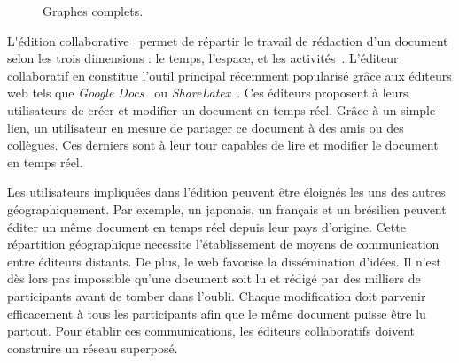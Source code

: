 




\begin{figure}
  \begin{center}
    
    \caption[Graphes complets]{\label{net:fig:completegraph}Graphes complets.}
  \end{center}
\end{figure}

\lettrine{L}'édition collaborative~\cite{ellis1991groupware} permet de répartir
le travail de rédaction d'un document selon les trois dimensions : le temps,
l'espace, et les activités~\cite{desanctis1987foundation,
  grudin1994computersupported, johansen1988groupware}. L'éditeur collaboratif en
constitue l'outil principal récemment popularisé grâce aux éditeurs web tels que
\emph{Google Docs}~\cite{googledocs} ou \emph{ShareLatex}~\cite{sharelatex}. Ces
éditeurs proposent à leurs utilisateurs de créer et modifier un document en
temps réel. Grâce à un simple lien, un utilisateur en mesure de partager ce
document à des amis ou des collègues. Ces derniers sont à leur tour capables de
lire et modifier le document en temps réel.

Les utilisateurs impliquées dans l'édition peuvent être éloignés les uns des
autres géographiquement. Par exemple, un japonais, un français et un brésilien
peuvent éditer un même document en temps réel depuis leur pays d'origine. Cette
répartition géographique necessite l'établissement de moyens de communication
entre éditeurs distants. De plus, le web favorise la dissémination d'idées. Il
n'est dès lors pas impossible qu'une document soit lu et rédigé par des milliers
de participants avant de tomber dans l'oubli.  Chaque modification doit parvenir
efficacement à tous les participants afin que le même document puisse être lu
partout. Pour établir ces communications, les éditeurs collaboratifs doivent
construire un réseau superposé.

